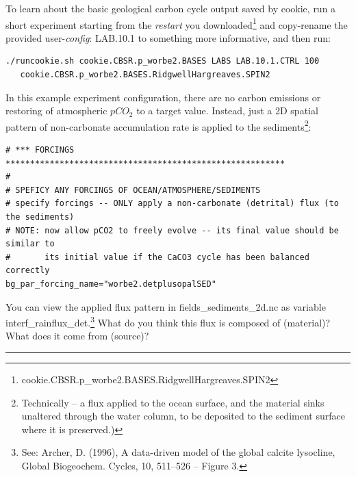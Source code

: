 To learn about the basic geological carbon cycle output saved by cookie, run a short experiment starting from the \textit{restart} you downloaded\footnote{\textsf{\footnotesize cookie.CBSR.p\_worbe2.BASES.RidgwellHargreaves.SPIN2}} and copy-rename the provided user-\textit{config}: \textsf{\footnotesize LAB.10.1} to something more informative, and then run:

\vspace{-1mm}\small\begin{verbatim}
./runcookie.sh cookie.CBSR.p_worbe2.BASES LABS LAB.10.1.CTRL 100 
   cookie.CBSR.p_worbe2.BASES.RidgwellHargreaves.SPIN2
\end{verbatim}\normalsize\vspace{-2mm}

In this example experiment configuration, there are no carbon emissions or restoring of atmospheric $pCO_{2}$ to a target value. Instead, just a 2D spatial pattern of non-carbonate accumulation rate is applied to the sediments\footnote{Technically -- a flux applied to the ocean surface, and the material sinks unaltered through the water column, to be deposited to the sediment surface where it is preserved.)}:

\vspace{-1mm}\footnotesize\begin{verbatim}
# *** FORCINGS *********************************************************
#
# SPEFICY ANY FORCINGS OF OCEAN/ATMOSPHERE/SEDIMENTS
# specify forcings -- ONLY apply a non-carbonate (detrital) flux (to the sediments)
# NOTE: now allow pCO2 to freely evolve -- its final value should be similar to 
#       its initial value if the CaCO3 cycle has been balanced correctly
bg_par_forcing_name="worbe2.detplusopalSED"
\end{verbatim}\normalsize\vspace{-2mm}

You can view the applied flux pattern in \textsf{\footnotesize fields\_sediments\_2d.nc} as variable \textsf{\footnotesize interf\_rainflux\_det}.\footnote{See: Archer, D. (1996), A data-driven model of the global calcite lysocline, Global Biogeochem. Cycles, 10, 511–526 -- Figure 3.} What do you think this flux is composed of (material)? What does it come from (source)?

\vspace{1mm}\noindent\rule{4cm}{0.1mm}\vspace{2mm}

